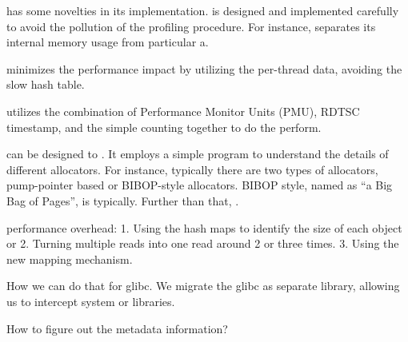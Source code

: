 \MP{} has some novelties in its implementation. \MP{} is designed and implemented carefully to avoid the pollution of the profiling procedure. For instance, \MP{} separates its internal memory usage from particular a. 

\MP{} minimizes the performance impact by utilizing the per-thread data, avoiding the slow hash table. 




\MP{} utilizes the combination of Performance Monitor Units (PMU), RDTSC timestamp, and the simple counting together to do the perform. 

\MP{} can be designed to . It employs a simple program to understand the details of different allocators. For instance, typically there are two types of allocators, pump-pointer based or BIBOP-style allocators. BIBOP style, named as ``a Big Bag of Pages'', is typically. Further than that, \MP{} .


performance overhead: 
1. Using the hash maps to identify the size of each object or 
2. Turning multiple reads into one read around 2 or three times. 
3. Using the new mapping mechanism. 

How we can do that for glibc. We migrate the glibc as separate library, allowing us to intercept system or libraries. 

How to figure out the metadata information?
 

